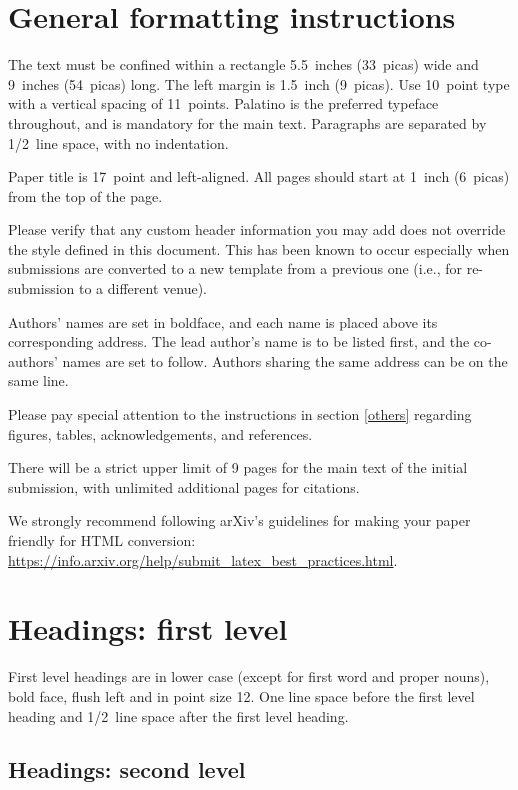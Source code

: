 \documentclass{article} %
\begin{document}
\section{General formatting instructions}
\label{gen_inst}

The text must be confined within a rectangle 5.5~inches (33~picas) wide and
9~inches (54~picas) long. The left margin is 1.5~inch (9~picas).
Use 10~point type with a vertical spacing of 11~points. Palatino is the
preferred typeface throughout, and is mandatory for the main text. Paragraphs are separated by 1/2~line space, with no indentation. 

Paper title is 17~point and left-aligned.
All pages should start at 1~inch (6~picas) from the top of the page.

Please verify that any custom header information you may add does not override the style defined in this document. This has been known to occur especially when submissions are converted to a new template from a previous one (i.e., for re-submission to a different venue). 

Authors' names are
set in boldface, and each name is placed above its corresponding
address. The lead author's name is to be listed first, and
the co-authors' names are set to follow. Authors sharing the
same address can be on the same line.

Please pay special attention to the instructions in section \ref{others}
regarding figures, tables, acknowledgements, and references.


There will be a strict upper limit of 9 pages for the main text of the initial submission, with unlimited additional pages for citations. 

We strongly recommend following arXiv's guidelines for making your paper friendly for HTML conversion: \url{https://info.arxiv.org/help/submit_latex_best_practices.html}.


\section{Headings: first level}
\label{headings}

First level headings are in lower case (except for first word and proper nouns), bold face,
flush left and in point size 12. One line space before the first level
heading and 1/2~line space after the first level heading.

\subsection{Headings: second level}
\end{document}
